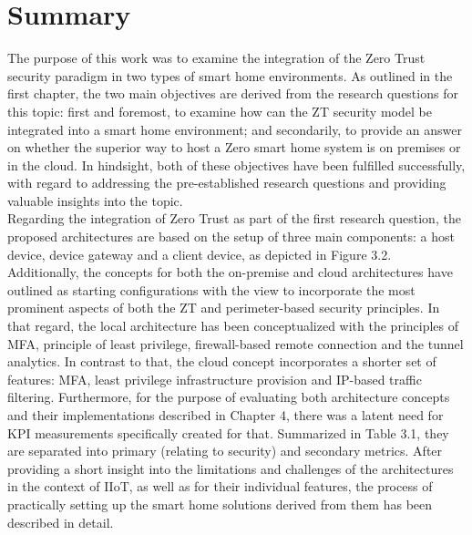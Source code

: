 \section{Summary}
The purpose of this work was to examine the integration of the Zero Trust security paradigm in two types of smart home environments. As outlined in the first chapter, the two main objectives are derived from the research questions for this topic: first and foremost, to examine how can the ZT security model be integrated into a smart home environment; and secondarily, to provide an answer on whether the superior way to host a Zero smart home system is on premises or in the cloud. In hindsight, both of these objectives have been fulfilled successfully, with regard to addressing the pre-established research questions and providing valuable insights into the topic.\\
Regarding the integration of Zero Trust as part of the first research question, the proposed architectures are based on the setup of three main components: a host device, device gateway and a client device, as depicted in Figure 3.2. Additionally, the concepts for both the on-premise and cloud architectures have outlined as starting configurations with the view to incorporate the most prominent aspects of both the ZT and perimeter-based security principles. In that regard, the local architecture has been conceptualized with the principles of MFA, principle of least privilege, firewall-based remote connection and the tunnel analytics. In contrast to that, the cloud concept incorporates a shorter set of features: MFA, least privilege infrastructure provision and IP-based traffic filtering. Furthermore, for the purpose of evaluating both architecture concepts and their implementations described in Chapter 4, there was a latent need for KPI measurements specifically created for that. Summarized in Table 3.1, they are separated into primary (relating to security) and secondary metrics. After providing a short insight into the limitations and challenges of the architectures in the context of IIoT, as well as for their individual features, the process of practically setting up the smart home solutions derived from them has been described in detail.


